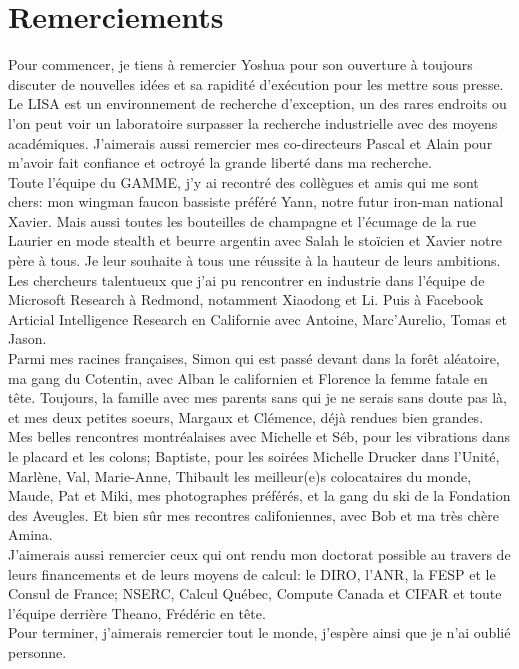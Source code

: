 \chapter*{Remerciements}
\vspace{-0.5cm}
Pour commencer, je tiens à remercier Yoshua pour son ouverture à toujours
discuter de nouvelles idées et sa rapidité d'exécution pour les mettre sous
presse. Le LISA est un environnement de recherche d'exception, un des rares
endroits ou l'on peut voir un laboratoire surpasser la recherche industrielle
avec des moyens académiques. J'aimerais aussi remercier mes co-directeurs Pascal
et Alain pour m'avoir fait confiance et octroyé la grande liberté dans ma
recherche.
\\

\vspace{-0.1cm}
Toute l'équipe du GAMME, j'y ai recontré des collègues et amis qui me sont
chers: mon wingman faucon bassiste préféré Yann, notre futur iron-man national
Xavier. Mais aussi toutes les bouteilles de champagne et l'écumage de la rue
Laurier en mode stealth et beurre argentin avec Salah le stoïcien et Xavier
notre père à tous.  Je leur souhaite à tous une réussite à la hauteur de leurs
ambitions.
\\

\vspace{-0.1cm}
Les chercheurs talentueux que j'ai pu rencontrer en industrie dans l'équipe de
Microsoft Research à Redmond, notamment Xiaodong et Li. Puis à Facebook
Articial Intelligence Research en Californie avec Antoine, Marc'Aurelio, Tomas
et Jason.
\\

\vspace{-0.1cm}
Parmi mes racines françaises, Simon qui est passé devant dans la forêt
aléatoire, ma gang du Cotentin, avec Alban le californien et Florence la femme
fatale en tête. Toujours, la famille avec mes parents sans qui je ne serais sans
doute pas là, et mes deux petites soeurs, Margaux et Clémence, déjà rendues bien grandes.
\\

\vspace{-0.1cm}
Mes belles rencontres montréalaises avec Michelle et Séb, pour les vibrations
dans le placard et les colons; Baptiste, pour les soirées Michelle Drucker
dans l'Unité, Marlène, Val, Marie-Anne, Thibault les meilleur(e)s
colocataires du monde, Maude, Pat et Miki, mes photographes préférés, et la
gang du ski de la Fondation des Aveugles. Et bien sûr mes recontres
califoniennes, avec Bob et ma très chère Amina.
\\

\vspace{-0.1cm}
J'aimerais aussi remercier ceux qui ont rendu mon doctorat possible
au travers de leurs financements et de leurs moyens de calcul: le DIRO, l'ANR,
la FESP et le Consul de France; NSERC, Calcul Québec, Compute Canada et CIFAR
et toute l'équipe derrière Theano, Frédéric en tête. 
\\

\vspace{-0.1cm}
Pour terminer, j'aimerais remercier tout le monde, j'espère ainsi que je n'ai
oublié personne.
